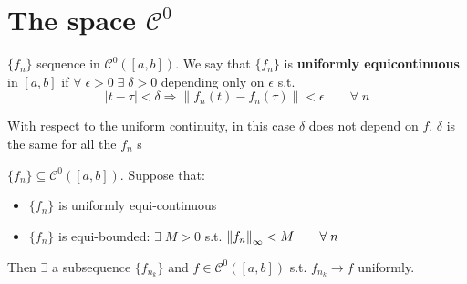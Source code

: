 \section{The space \texorpdfstring{\(\mathcal{C}^0\)}{C0}}
\begin{definition}
    \(\{f_n\}\) sequence in \(\mathcal{C}^0(\left[a, b\right])\). 
    We say that \(\{f_n\}\) is \textbf{uniformly equicontinuous} in \([a, b]\) if \(\forall \; \epsilon >0 \; \exists \; \delta >0 \) depending only on \(\epsilon \) s.t. 
    \[
        |t-\tau| < \delta \Rightarrow \| f_n(t) - f_n(\tau) \| < \epsilon \qquad \forall \; n
    \]
\end{definition}

\begin{remark}
    With respect to the uniform continuity, in this case \(\delta\) does not depend on \(f\). \(\delta\) is the same for all the \(f_n\) s
\end{remark}

\begin{theorem}
    \(\{f_n\} \subseteq \mathcal{C}^0(\left[a, b\right])\). Suppose that:
    \begin{itemize}
        \item \(\{f_n\}\) is uniformly equi-continuous
        \item \(\{f_n\}\) is equi-bounded: \(\exists \; M>0\) s.t. \(\norm{f_n}_\infty <M \qquad \forall \; n\)
    \end{itemize}
    Then \(\exists\) a subsequence \(\{f_{n_k}\}\) and \(f \in \mathcal{C}^0(\left[a, b\right])\) s.t. \(f_{n_k} \rightarrow f \) uniformly.
\end{theorem}
